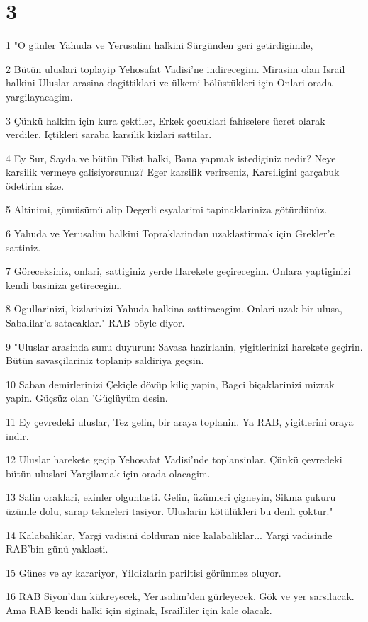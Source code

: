 \chapter{3}

\par 1 "O günler Yahuda ve Yerusalim halkini Sürgünden geri getirdigimde,
\par 2 Bütün uluslari toplayip Yehosafat Vadisi'ne indirecegim. Mirasim olan Israil halkini Uluslar arasina dagittiklari ve ülkemi bölüstükleri için Onlari orada yargilayacagim.
\par 3 Çünkü halkim için kura çektiler, Erkek çocuklari fahiselere ücret olarak verdiler. Içtikleri saraba karsilik kizlari sattilar.
\par 4 Ey Sur, Sayda ve bütün Filist halki, Bana yapmak istediginiz nedir? Neye karsilik vermeye çalisiyorsunuz? Eger karsilik verirseniz, Karsiligini çarçabuk ödetirim size.
\par 5 Altinimi, gümüsümü alip Degerli esyalarimi tapinaklariniza götürdünüz.
\par 6 Yahuda ve Yerusalim halkini Topraklarindan uzaklastirmak için Grekler'e sattiniz.
\par 7 Göreceksiniz, onlari, sattiginiz yerde Harekete geçirecegim. Onlara yaptiginizi kendi basiniza getirecegim.
\par 8 Ogullarinizi, kizlarinizi Yahuda halkina sattiracagim. Onlari uzak bir ulusa, Sabalilar'a satacaklar." RAB böyle diyor.
\par 9 "Uluslar arasinda sunu duyurun: Savasa hazirlanin, yigitlerinizi harekete geçirin. Bütün savasçilariniz toplanip saldiriya geçsin.
\par 10 Saban demirlerinizi Çekiçle dövüp kiliç yapin, Bagci biçaklarinizi mizrak yapin. Güçsüz olan 'Güçlüyüm desin.
\par 11 Ey çevredeki uluslar, Tez gelin, bir araya toplanin. Ya RAB, yigitlerini oraya indir.
\par 12 Uluslar harekete geçip Yehosafat Vadisi'nde toplansinlar. Çünkü çevredeki bütün uluslari Yargilamak için orada olacagim.
\par 13 Salin oraklari, ekinler olgunlasti. Gelin, üzümleri çigneyin, Sikma çukuru üzümle dolu, sarap tekneleri tasiyor. Uluslarin kötülükleri bu denli çoktur."
\par 14 Kalabaliklar, Yargi vadisini dolduran nice kalabaliklar... Yargi vadisinde RAB'bin günü yaklasti.
\par 15 Günes ve ay karariyor, Yildizlarin pariltisi görünmez oluyor.
\par 16 RAB Siyon'dan kükreyecek, Yerusalim'den gürleyecek. Gök ve yer sarsilacak. Ama RAB kendi halki için siginak, Israilliler için kale olacak.
